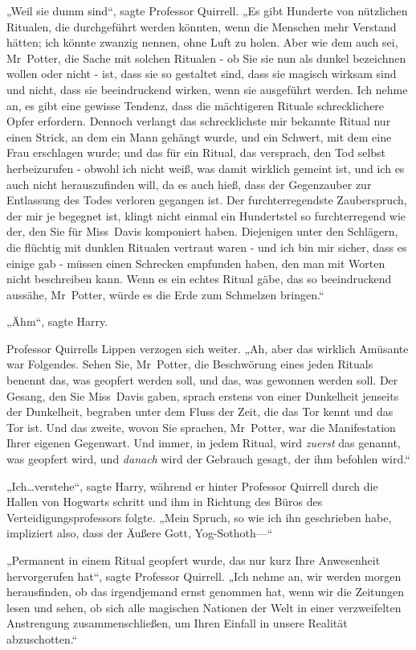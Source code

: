 {„Weil sie dumm sind“, sagte Professor Quirrell. „Es gibt Hunderte von nützlichen Ritualen, die durchgeführt werden könnten, wenn die Menschen mehr Verstand hätten; ich könnte zwanzig nennen, ohne Luft zu holen. Aber wie dem auch sei, Mr~Potter, die Sache mit solchen Ritualen - ob Sie sie nun als dunkel bezeichnen wollen oder nicht - ist, dass sie so gestaltet sind, dass sie magisch wirksam sind und nicht, dass sie beeindruckend wirken, wenn sie ausgeführt werden. Ich nehme an, es gibt eine gewisse Tendenz, dass die mächtigeren Rituale schrecklichere Opfer erfordern. Dennoch verlangt das schrecklichste mir bekannte Ritual nur einen Strick, an dem ein Mann gehängt wurde, und ein Schwert, mit dem eine Frau erschlagen wurde; und das für ein Ritual, das versprach, den Tod selbst herbeizurufen - obwohl ich nicht weiß, was damit wirklich gemeint ist, und ich es auch nicht herauszufinden will, da es auch hieß, dass der Gegenzauber zur Entlassung des Todes verloren gegangen ist. Der furchterregendste Zauberspruch, der mir je begegnet ist, klingt nicht einmal ein Hundertstel so furchterregend wie der, den Sie für Miss~Davis komponiert haben. Diejenigen unter den Schlägern, die flüchtig mit dunklen Ritualen vertraut waren - und ich bin mir sicher, dass es einige gab - müssen einen Schrecken empfunden haben, den man mit Worten nicht beschreiben kann. Wenn es ein echtes Ritual gäbe, das so beeindruckend aussähe, Mr~Potter, würde es die Erde zum Schmelzen bringen.“

„Ähm“, sagte Harry.

Professor Quirrells Lippen verzogen sich weiter. „Ah, aber das wirklich Amüsante war Folgendes. Sehen Sie, Mr~Potter, die Beschwörung eines jeden Rituals benennt das, was geopfert werden soll, und das, was gewonnen werden soll. Der Gesang, den Sie Miss~Davis gaben, sprach erstens von einer Dunkelheit jenseits der Dunkelheit, begraben unter dem Fluss der Zeit, die das Tor kennt und das Tor ist. Und das zweite, wovon Sie sprachen, Mr~Potter, war die Manifestation Ihrer eigenen Gegenwart. Und immer, in jedem Ritual, wird \emph{zuerst} das genannt, was geopfert wird, und \emph{danach} wird der Gebrauch gesagt, der ihm befohlen wird.“

„Ich…verstehe“, sagte Harry, während er hinter Professor Quirrell durch die Hallen von Hogwarts schritt und ihm in Richtung des Büros des Verteidigungsprofessors folgte. „Mein Spruch, so wie ich ihn geschrieben habe, impliziert also, dass der Äußere Gott, Yog-Sothoth—“

„Permanent in einem Ritual geopfert wurde, das nur kurz Ihre Anwesenheit hervorgerufen hat“, sagte Professor Quirrell. „Ich nehme an, wir werden morgen herausfinden, ob das irgendjemand ernst genommen hat, wenn wir die Zeitungen lesen und sehen, ob sich alle magischen Nationen der Welt in einer verzweifelten Anstrengung zusammenschließen, um Ihren Einfall in unsere Realität abzuschotten.“

}
